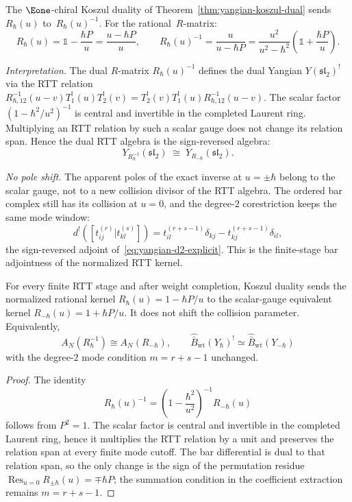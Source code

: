 \begin{computation}
\label{comp:yangian-dual-explicit}

The $\Eone$-chiral Koszul duality of
Theorem~\ref{thm:yangian-koszul-dual}
sends $R_\hbar(u)$ to~$R_\hbar(u)^{-1}$.
For the rational~$R$-matrix:
\[
R_\hbar(u)=\mathbb{1}-\frac{\hbar P}{u}
=\frac{u-\hbar P}{u},\qquad
R_\hbar(u)^{-1}
=\frac{u}{u-\hbar P}
=\frac{u^2}{u^2-\hbar^2}
\left(\mathbb{1}+\frac{\hbar P}{u}\right).
\]

\emph{Interpretation.}
The dual $R$-matrix $R_\hbar(u)^{-1}$ defines the dual Yangian
$Y(\mathfrak{sl}_2)^!$ via the RTT relation
$R_{\hbar,12}^{-1}(u-v) T_1^!(u) T_2^!(v)
= T_2^!(v) T_1^!(u) R_{\hbar,12}^{-1}(u-v)$.
The scalar factor $(1-\hbar^2/u^2)^{-1}$ is central and invertible
in the completed Laurent ring. Multiplying an RTT relation by such a
scalar gauge does not change its relation span. Hence the dual RTT
algebra is the sign-reversed algebra:
\[
Y_{R_\hbar^{-1}}(\mathfrak{sl}_2)
\;\cong\;
Y_{R_{-\hbar}}(\mathfrak{sl}_2).
\]

\emph{No pole shift.}
The apparent poles of the exact inverse at $u=\pm\hbar$ belong to the
scalar gauge, not to a new collision divisor of the RTT algebra. The
ordered bar complex still has its collision at $u=0$, and the
degree-$2$ corestriction keeps the same mode window:
\[
d^!([t_{ij}^{(r)} | t_{kl}^{(s)}])
= t_{il}^{(r+s-1)} \delta_{kj}
 - t_{kj}^{(r+s-1)} \delta_{il},
\]
the sign-reversed adjoint of~\eqref{eq:yangian-d2-explicit}. This is
the finite-stage bar adjointness of the normalized RTT kernel.
\end{computation}

\begin{proposition}\label{prop:yangian-scalar-gauge-selfdual}
For every finite RTT stage and after weight completion, Koszul
duality sends the normalized rational kernel
$R_\hbar(u)=1-\hbar P/u$ to the scalar-gauge equivalent kernel
$R_{-\hbar}(u)=1+\hbar P/u$. It does not shift the collision
parameter. Equivalently,
\[
A_N(R_\hbar^{-1})\cong A_N(R_{-\hbar}),\qquad
\widehat{\bar B}_{\mathrm{wt}}(Y_\hbar)^!
\simeq
\widehat{\bar B}_{\mathrm{wt}}(Y_{-\hbar})
\]
with the degree-$2$ mode condition $m=r+s-1$ unchanged.
\end{proposition}

\begin{proof}
The identity
\[
R_\hbar(u)^{-1}
=\left(1-\frac{\hbar^2}{u^2}\right)^{-1}R_{-\hbar}(u)
\]
follows from $P^2=1$. The scalar factor is central and invertible in
the completed Laurent ring, hence it multiplies the RTT relation by a
unit and preserves the relation span at every finite mode cutoff. The
bar differential is dual to that relation span, so the only change is
the sign of the permutation residue
$\operatorname*{Res}_{u=0}R_{\pm\hbar}(u)=\mp\hbar P$; the summation
condition in the coefficient extraction remains $m=r+s-1$.
\end{proof}

